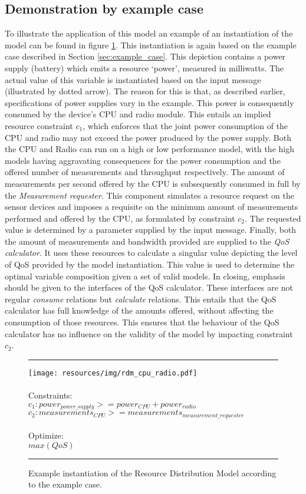 \subsection{Demonstration by example case}
To illustrate the application of this model an example of an instantiation of the model can be found in figure \ref{fig:rdm_cpu_radio}. This instantiation is again based on the example case described in Section \ref{sec:example_case}. This depiction contains a power supply (battery) which emits a resource `power', measured in milliwatts. The actual value of this variable is instantiated based on the input message (illustrated by dotted arrow). The reason for this is that, as described earlier, specifications of power supplies vary in the example. This power is consequently consumed by the device's CPU and radio module. This entails an implied resource constraint $c_1$, which enforces that the joint power consumption of the CPU and radio may not exceed the power produced by the power supply. Both the CPU and Radio can run on a high or low performance model, with the high models having aggravating consequences for the power consumption and the offered number of measurements and throughput respectively. The amount of measurements per second offered by the CPU is subsequently consumed in full by the \emph{Measurement requester}. This component simulates a resource request on the sensor devices and imposes a requisite on the minimum amount of measurements performed and offered by the CPU, as formulated by constraint $c_2$. The requested value is determined by a parameter supplied by the input message. Finally, both the amount of measurements and bandwidth provided are supplied to the \emph{QoS calculator}. It uses these resources to calculate a singular value depicting the level of QoS provided by the model instantiation. This value is used to determine the optimal variable composition given a set of valid models. In closing, emphasis should be given to the interfaces of the QoS calculator. These interfaces are not regular \emph{consume} relations but \emph{calculate} relations. This entails that the QoS calculator has full knowledge of the amounts offered, without affecting the consumption of those resources. This ensures that the behaviour of the QoS calculator has no influence on the validity of the model by impacting constraint $c_2$.

\begin{figure}
\hrule
\begingroup\centering
  \texttt{[image: resources/img/rdm\_cpu\_radio.pdf]}\endgroup \\ \\
  \noindent Constraints: \\
$c_1: power_{power\_supply} >= power_{CPU}+power_{radio} $ \\ 
$c_2: measurements_{CPU} >= measurements_{measurement\_requester}$ \\ \\
\noindent Optimize:\\$max(QoS)$\\
\hrule
\caption{Example instantiation of the Resource Distribution Model according to the example case.}
  \label{fig:rdm_cpu_radio}
\end{figure}

